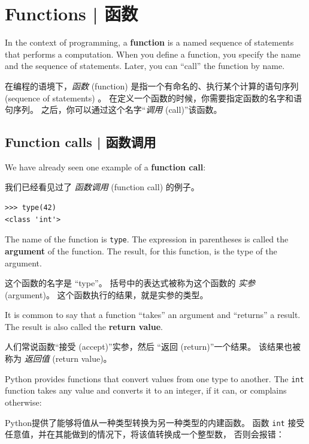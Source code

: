 
\chapter{Functions  |  函数}
\label{funcchap}

In the context of programming, a {\bf function} is a named sequence of
statements that performs a computation.  When you define a function,
you specify the name and the sequence of statements.  Later, you can
``call'' the function by name.

在编程的语境下，\emph{函数} (function)  是指一个有命名的、执行某个计算的语句序列(sequence of statements) 。  在定义一个函数的时候，你需要指定函数的名字和语句序列。  之后，你可以通过这个名字``{\em 调用} (call)''该函数。


%
\section{Function calls  |  函数调用}
\label{functionchap}

We have already seen one example of a {\bf function call}:

我们已经看见过了 \emph{函数调用} (function call) 的例子。

\begin{lstlisting}
>>> type(42)
<class 'int'>
\end{lstlisting}
%
The name of the function is {\tt type}.  The expression in parentheses
is called the {\bf argument} of the function.  The result, for this
function, is the type of the argument.

这个函数的名字是 ``type''。 括号中的表达式被称为这个函数的 \emph{实参} (argument)。 这个函数执行的结果，就是实参的类型。

It is common to say that a function ``takes'' an argument and ``returns''
a result.  The result is also called the {\bf return value}.

人们常说函数``接受 (accept)''实参，然后 ``返回 (return)''一个结果。
该结果也被称为 \emph{返回值} (return value)。
  
  

Python provides functions that convert values
from one type to another.  The {\tt int} function takes any value and
converts it to an integer, if it can, or complains otherwise:

Python提供了能够将值从一种类型转换为另一种类型的内建函数。
函数 \lstinline{int} 接受任意值，并在其能做到的情况下，将该值转换成一个整型数，
否则会报错：
  
  
  
  


